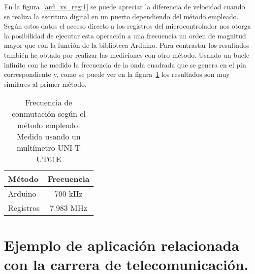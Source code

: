 En la figura~\ref{ard_vs_reg:1} se puede apreciar la diferencia de velocidad cuando se realiza la escritura digital en un puerto dependiendo del método empleado. Según estos datos el acceso directo a los registros del microcontrolador nos otorga la posibilidad de ejecutar esta operación a una frecuencia un orden de magnitud mayor que con la función  de la biblioteca Arduino. Para contrastar los resultados también he obtado por realizar las mediciones con otro método. Usando un bucle infinito con  he medido la frecuencia de la onda cuadrada que se genera en el pin correspondiente y, como se puede ver en la figura~\ref{ard_vs_reg:2} los resultados son muy similares al primer método.

\begin{table}[htb]
	\begin{center}
		\begin{tabular}{|l|c|}
			\hline
			Método		&		Frecuencia	\\
			\hline
			\hline
			Arduino		&		700 kHz			\\
			\hline
			Registros	&		7.983	MHz		\\
			\hline
		\end{tabular}
	\end{center}
	\caption{Frecuencia de conmutación según el método empleado. Medida usando un multímetro UNI-T UT61E}
	\label{ard_vs_reg:2}
\end{table}


\section{Ejemplo de aplicación relacionada con la carrera de telecomunicación.} %
\label{sec:Ejemplo de aplicación relacionada con la carrera de telecomunicación.}

